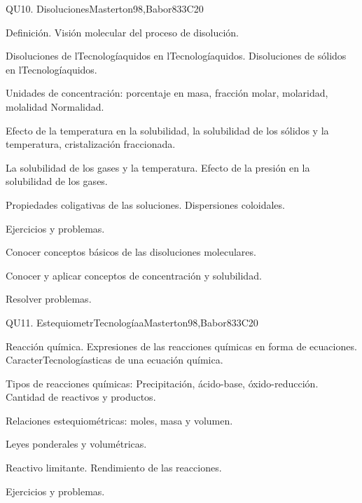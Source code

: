 \begin{syllabus}
\begin{unit}{QU10. Disoluciones}{}{Masterton98,Babor83}{3}{C20}
\begin{topics}
      \item Definición. Visión molecular del proceso de disolución.
      \item Disoluciones de lTecnologíaquidos en lTecnologíaquidos. Disoluciones de sólidos en lTecnologíaquidos.
      \item Unidades de concentración: porcentaje en masa, fracción molar, molaridad, molalidad Normalidad.
      \item Efecto de la temperatura en la solubilidad, la solubilidad de los sólidos y la temperatura, cristalización fraccionada.
      \item La solubilidad de los gases y la temperatura. Efecto  de la presión en la solubilidad de los gases.
      \item Propiedades coligativas de las soluciones. Dispersiones coloidales.
      \item Ejercicios y problemas.
    \end{topics}

   \begin{learningoutcomes}
      \item Conocer conceptos básicos de las disoluciones moleculares.
      \item Conocer y aplicar conceptos de concentración y solubilidad.
      \item Resolver problemas.
   \end{learningoutcomes}
\end{unit}

\begin{unit}{QU11. EstequiometrTecnologíaa}{}{Masterton98,Babor83}{3}{C20}
\begin{topics}
      \item Reacción química. Expresiones de las reacciones químicas en forma de ecuaciones. CaracterTecnologíasticas de una ecuación química.
      \item Tipos de reacciones químicas: Precipitación, ácido-base, óxido-reducción. Cantidad de reactivos y productos.
      \item Relaciones estequiométricas: moles, masa y volumen.
      \item Leyes ponderales y volumétricas.
      \item Reactivo limitante. Rendimiento de las reacciones.
      \item Ejercicios y problemas.
    \end{topics}


\end{unit}
\end{syllabus}
